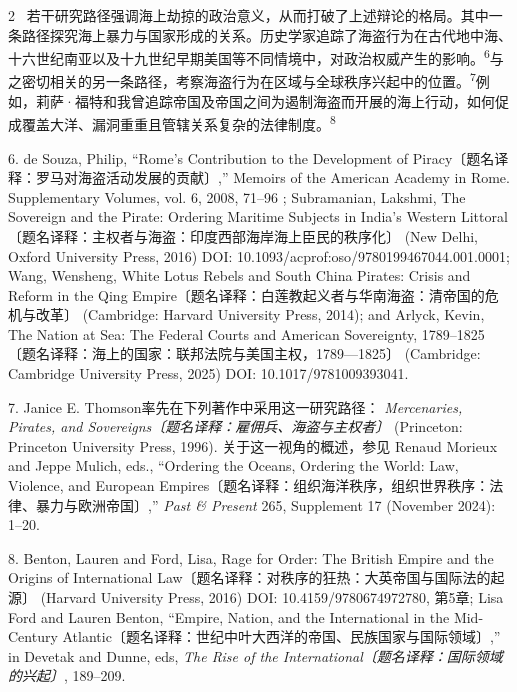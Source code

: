 \documentclass[10pt,a4paper]{article}
\begin{document}
\begin{paracol}{2}
\switchcolumn*
{\scriptsize\color{gray} [p. 2]}\ 若干研究路径强调海上劫掠的政治意义，从而打破了上述辩论的格局。其中一条路径探究海上暴力与国家形成的关系。历史学家追踪了海盗行为在古代地中海、十六世纪南亚以及十九世纪早期美国等不同情境中，对政治权威产生的影\mbox{响。\textsuperscript{6}}与之密切相关的另一条路径，考察海盗行为在区域与全球秩序兴起中的位\mbox{置。\textsuperscript{7}}例如，莉萨·福特和我曾追踪帝国及帝国之间为遏制海盗而开展的海上行动，如何促成覆盖大洋、漏洞重重且管辖关系复杂的法律制\mbox{度。\textsuperscript{8}}\par{\small 6. de Souza, Philip, “Rome’s Contribution to the Development of Piracy〔题名译释：罗马对海盗活动发展的贡献〕,” Memoirs of the American Academy in Rome. Supplementary Volumes, vol. 6, 2008, 71–96 ; Subramanian, Lakshmi, The Sovereign and the Pirate: Ordering Maritime Subjects in India’s Western Littoral〔题名译释：主权者与海盗：印度西部海岸海上臣民的秩序化〕 (New Delhi, Oxford University Press, 2016) DOI: 10.1093/acprof:oso/9780199467044.001.0001; Wang, Wensheng, White Lotus Rebels and South China Pirates: Crisis and Reform in the Qing Empire〔题名译释：白莲教起义者与华南海盗：清帝国的危机与改革〕 (Cambridge: Harvard University Press, 2014); and Arlyck, Kevin, The Nation at Sea: The Federal Courts and American Sovereignty, 1789–1825〔题名译释：海上的国家：联邦法院与美国主权，1789—1825〕 (Cambridge: Cambridge University Press, 2025) DOI: 10.1017/9781009393041.\par}{\small 7. Janice E. Thomson率先在下列著作中采用这一研究路径： \textit{Mercenaries, Pirates, and Sovereigns〔题名译释：雇佣兵、海盗与主权者〕} (Princeton: Princeton University Press, 1996). 关于这一视角的概述，参见 Renaud Morieux and Jeppe Mulich, eds., “Ordering the Oceans, Ordering the World: Law, Violence, and European Empires〔题名译释：组织海洋秩序，组织世界秩序：法律、暴力与欧洲帝国〕,” \textit{Past \& Present} 265, Supplement 17 (November 2024): 1–20.\par}{\small 8. Benton, Lauren and Ford, Lisa, Rage for Order: The British Empire and the Origins of International Law〔题名译释：对秩序的狂热：大英帝国与国际法的起源〕 (Harvard University Press, 2016) DOI: 10.4159/9780674972780, 第5章; Lisa Ford and Lauren Benton, “Empire, Nation, and the International in the Mid-Century Atlantic〔题名译释：世纪中叶大西洋的帝国、民族国家与国际领域〕,” in Devetak and Dunne, eds, \textit{The Rise of the International〔题名译释：国际领域的兴起〕}, 189–209.\par}
\switchcolumn

\end{paracol}
\end{document}
